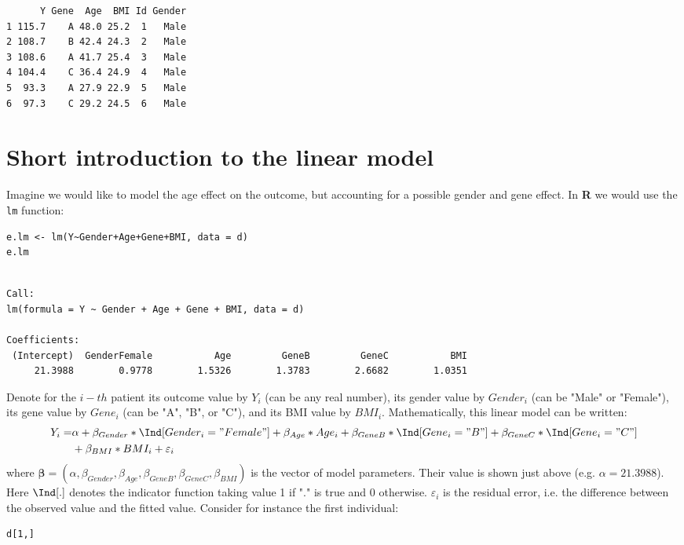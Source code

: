 \documentclass[12pt]{article}
\newcommand\Rlogo{\textbf{\textsf{R}}\xspace} %
\begin{document}
\begin{verbatim}
      Y Gene  Age  BMI Id Gender
1 115.7    A 48.0 25.2  1   Male
2 108.7    B 42.4 24.3  2   Male
3 108.6    A 41.7 25.4  3   Male
4 104.4    C 36.4 24.9  4   Male
5  93.3    A 27.9 22.9  5   Male
6  97.3    C 29.2 24.5  6   Male
\end{verbatim}

\clearpage

\section{Short introduction to the linear model}
\label{sec:org2befc06}

Imagine we would like to model the age effect on the outcome, but
accounting for a possible gender and gene effect. In \Rlogo{} we would
use the \texttt{lm} function:
\lstset{language=r,label= ,caption= ,captionpos=b,numbers=none}
\begin{lstlisting}
e.lm <- lm(Y~Gender+Age+Gene+BMI, data = d)
e.lm
\end{lstlisting}

\begin{verbatim}

Call:
lm(formula = Y ~ Gender + Age + Gene + BMI, data = d)

Coefficients:
 (Intercept)  GenderFemale           Age         GeneB         GeneC           BMI  
     21.3988        0.9778        1.5326        1.3783        2.6682        1.0351
\end{verbatim}

Denote for the \(i-th\) patient its outcome value by \(Y_i\) (can be
any real number), its gender value by \(Gender_i\) (can be "Male" or
"Female"), its gene value by \(Gene_i\) (can be "A", "B", or
"C"), and its BMI value by \(BMI_i\). Mathematically, this linear model can be written:
\begin{align*}
Y_i =& \alpha + \beta_{Gender} * \Ind[Gender_i="Female"] + \beta_{Age} * Age_i + \beta_{GeneB} *  \Ind[Gene_i="B"] + \beta_{GeneC} * \Ind[Gene_i="C"] \\
& + \beta_{BMI} * BMI_i + \varepsilon_i
\end{align*}
where \(\boldsymbol{\beta} =
(\alpha,\beta_{Gender},\beta_{Age},\beta_{GeneB},\beta_{GeneC},\beta_{BMI})\) is
the vector of model parameters. Their value is shown just above
(e.g. \(\alpha=21.3988\)). Here \(\Ind[.]\) denotes the indicator
function taking value 1 if "." is true and 0
otherwise. \(\varepsilon_i\) is the residual error, i.e. the
difference between the observed value and the fitted value. Consider
for instance the first individual:
\lstset{language=r,label= ,caption= ,captionpos=b,numbers=none}
\begin{lstlisting}
d[1,]
\end{lstlisting}
\end{document}
